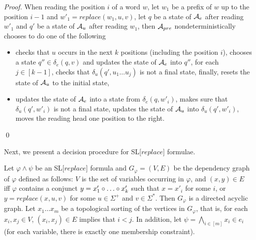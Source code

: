 \documentclass{llncs}
\begin{document}
{\begin{proof}
When reading the position $i$ of a word $w$, let $w_1$ be a prefix of $w$ up to the position $i-1$ and $w'_1 = replace(w_1, u, v)$, let $q$ be a state of $\mathcal{A}_e$ after reading $w'_1$ and $q'$ be a state of $\mathcal{A}_u$ after reading $w_1$, then $\mathcal{A}_{pre}$ nondeterministically chooses to do one of the following
\begin{itemize}
\item checks that $u$ occurs in the next $k$ positions (including the position $i$), chooses a state $q'' \in \delta_e(q, v)$ and updates the state of $\mathcal{A}_e$ into $q''$, for each $j \in [k-1]$, checks that $\delta_u(q', u_1 \dots u_j)$ is not a final state, finally, resets the state of $\mathcal{A}_u$ to the initial state,
%
\item updates the state of $\mathcal{A}_e$ into a state from $\delta_e(q, w'_i)$,  makes sure that $\delta_u(q', w'_i)$ is not a final state, updates the state of $\mathcal{A}_u$ into $\delta_u(q', w'_i)$,  moves the reading head one position to the right.
\end{itemize}
\qed
\end{proof}

Next, we present a decision procedure for SL[$replace$] formulae.

Let $\varphi \wedge \psi$ be an SL[$replace$] formula and $G_\varphi = (V, E)$ be the dependency graph of $\varphi$ defined as follows: $V$ is the set of variables occurring in $\varphi$, and $(x, y) \in E$ iff $\varphi$ contains a conjunct $y = x'_1 \concat \dots \concat x'_k$ such that $x = x'_i$ for some $i$, or $y =replace(x, u, v)$ for some $u \in \Sigma^+$ and $v \in \Sigma^\ast$.  Then $G_\varphi$ is a directed acyclic graph. Let $x_1 \dots x_m$ be a topological sorting of the vertices in $G_\varphi$, that is, for each $x_i, x_j \in V$, $(x_i, x_j) \in E$ implies that $i < j$. In addition, let $\psi = \bigwedge \limits_{i \in [m]} x_i \in e_i$ (for each variable, there is exactly one membership constraint). 

}
\end{document}
